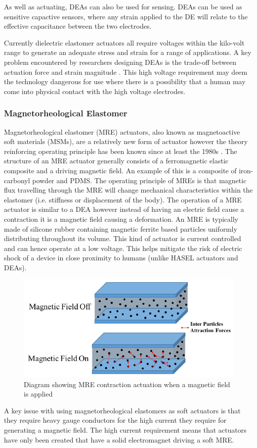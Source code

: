As well as actuating, DEAs can also be used for sensing. DEAs can be used as sensitive capactive sensors, where any strain applied to the DE will relate to the effective capacitance between the two electrodes\citep{Jung2008,Goulbourne2007,Gisby2013}. 

Currently dielectric elastomer actuators all require voltages within the kilo-volt range to generate an adequate stress and strain for a range of applications. A key problem encountered by researchers designing DEAs is the trade-off between actuation force and strain magnitude \citep{Hau2018}. This high voltage requirement may deem the technology dangerous for use where there is a possibility that a human may come into physical contact with the high voltage electrodes.

\subsubsection{Magnetorheological Elastomer}
Magnetorheological elastomer (MRE) actuators, also known as magnetoactive soft materials (MSMs), are a relatively new form of actuator however the theory reinforcing operating principle has been known since at least the 1980s \citep{Jolly1996}. The structure of an MRE actuator generally consists of a ferromagnetic elastic composite and a driving magnetic field. An example of this is a composite of iron-carbonyl powder and PDMS. The operating principle of MREs is that magnetic flux travelling through the MRE will change mechanical characteristics within the elastomer (i.e. stiffness or displacement of the body). The operation of a MRE actuator is similar to a DEA however instead of having an electric field cause a contraction it is a magnetic field causing a deformation. An MRE is typically made of silicone rubber containing magnetic ferrite based particles uniformly distributing throughout its volume. This kind of actuator is current controlled and can hence operate at a low voltage. This helps mitigate the risk of electric shock of a device in close proximity to humans (unlike HASEL actuators and DEAs).
\begin{figure}[h!]
  \centering
  \includegraphics[width=0.6\linewidth]{Figures/MRE_actuate.jpg}
  \caption{Diagram showing MRE contraction actuation when a magnetic field is applied\citep{Park2018a}}
  \label{fig:Artificial Muscle_MRE}
\end{figure}
A key issue with using magnetorheological elastomers as soft actuators is that they require heavy gauge conductors for the high current they require for generating a magnetic field. The high current requirement means that actuators have only been created that have a solid electromagnet driving a soft MRE\citep{Bose2012}. 

